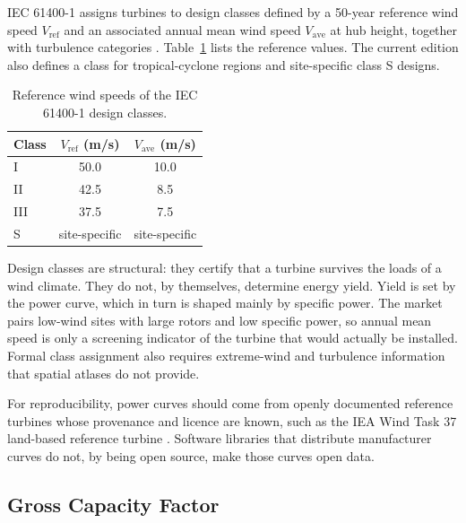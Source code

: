 IEC 61400-1 assigns turbines to design classes defined by a 50-year
reference wind speed $V_{\mathrm{ref}}$ and an associated annual mean
wind speed $V_{\mathrm{ave}}$ at hub height, together with turbulence
categories \cite{iec6140012025,larsen2022}. Table~\ref{tab:wind_iec_classes}
lists the reference values. The current edition also defines a class
for tropical-cyclone regions and site-specific class S designs.

\begin{table}[htbp]
    \centering
    \caption{Reference wind speeds of the IEC 61400-1 design classes.}
    \label{tab:wind_iec_classes}
    \small
    \begin{tabular}{lcc}
        \toprule
        Class & $V_{\mathrm{ref}}$ (m/s) & $V_{\mathrm{ave}}$ (m/s) \\
        \midrule
        I   & 50.0 & 10.0 \\
        II  & 42.5 & 8.5  \\
        III & 37.5 & 7.5  \\
        S   & site-specific & site-specific \\
        \bottomrule
    \end{tabular}
\end{table}

Design classes are structural: they certify that a turbine survives the
loads of a wind climate. They do not, by themselves, determine energy
yield. Yield is set by the power curve, which in turn is shaped mainly by
specific power. The market pairs low-wind sites with large rotors and
low specific power, so annual mean speed is only a screening indicator
of the turbine that would actually be installed. Formal class assignment
also requires extreme-wind and turbulence information that spatial
atlases do not provide.

For reproducibility, power curves should come from openly documented
reference turbines whose provenance and licence are known, such as the
IEA Wind Task 37 land-based reference turbine \cite{bortolotti2019}.
Software libraries that distribute manufacturer curves do not, by being
open source, make those curves open data.

\subsection{Gross Capacity Factor}
\label{subsec:wind_gross_cf}

